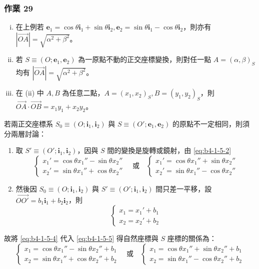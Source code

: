\subsubsection*{作業 29}
\begin{enumerate}[(i)]
  \item 在上例若 $\mathbf{e}_1 = \cos\theta\mathbf{i}_1 + \sin\theta\mathbf{i}_2, \mathbf{e}_2 = \sin\theta\mathbf{i}_1 - \cos\theta\mathbf{i}_2$，則亦有 $|\vec{OA}| = \sqrt{\alpha^2 + \beta^2}$。
  \item 若 $S \equiv (O; \mathbf{e}_1, \mathbf{e}_2)$ 為一原點不動的正交座標變換，則對任一點 $A = (\alpha, \beta)_S$ 均有 $|\vec{OA}| = \sqrt{\alpha^2 + \beta^2}$。
  \item 在 (ii) 中 $A, B$ 為任意二點，$A = (x_1, x_2)_S, B = (y_1, y_2)_S$，則 $\vec{OA} \cdot \vec{OB} = x_1 y_1 + x_2 y_2$。
\end{enumerate}

若兩正交座標系 $S_0 \equiv (O; \mathbf{i}_1, \mathbf{i}_2)$ 與 $S \equiv (O'; \mathbf{e}_1, \mathbf{e}_2)$ 的原點不一定相同，則須分兩層討論：
\begin{enumerate}[(1)]
  \item 取 $S' \equiv (O'; \mathbf{i}_1, \mathbf{i}_2)$，因與 $S$ 間的變換是旋轉或鏡射，由 \eqref{eq:b4-1-5-2}
  \begin{equation}
  \begin{cases} x_1' = \cos\theta x_1'' - \sin\theta x_2'' \\ x_2' = \sin\theta x_1'' + \cos\theta x_2'' \end{cases} \quad \text{或} \quad
  \begin{cases} x_1' = \cos\theta x_1'' + \sin\theta x_2'' \\ x_2' = \sin\theta x_1'' - \cos\theta x_2'' \end{cases} \label{eq:b4-1-5-4}
  \end{equation}
  \item 然後因 $S_0 \equiv (O; \mathbf{i}_1, \mathbf{i}_2)$ 與 $S' \equiv (O'; \mathbf{i}_1, \mathbf{i}_2)$ 間只差一平移，設 $\vec{OO'} = b_1\mathbf{i}_1 + b_2\mathbf{i}_2$，則
  \begin{equation}
  \begin{cases} x_1 = x_1' + b_1 \\ x_2 = x_2' + b_2 \end{cases} \label{eq:b4-1-5-5}
  \end{equation}
\end{enumerate}
故將 \eqref{eq:b4-1-5-4} 代入 \eqref{eq:b4-1-5-5} 得自然座標與 $S$ 座標的關係為：
\begin{equation}
\begin{cases}
x_1 = \cos\theta x_1'' - \sin\theta x_2'' + b_1 \\
x_2 = \sin\theta x_1'' + \cos\theta x_2'' + b_2
\end{cases} \quad \text{或} \quad
\begin{cases}
x_1 = \cos\theta x_1'' + \sin\theta x_2'' + b_1 \\
x_2 = \sin\theta x_1'' - \cos\theta x_2'' + b_2
\end{cases} \label{eq:b4-1-5-6}
\end{equation}


